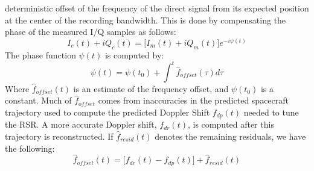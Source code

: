 \documentclass[oneside]{book}
\theoremstyle{mystyle}
\begin{document}
deterministic offset of the frequency of the direct signal from its expected position at the center of the recording bandwidth. This is done by compensating the phase of the measured I/Q samples as follows:
\begin{equation}
I_{c}(t) +iQ_{c}(t) = \big[I_{m}(t)+iQ_{m}(t)\big]e^{-i\psi(t)}
\end{equation}
\noindent The phase function $\psi(t)$ is computed by:
\begin{equation}
\psi(t) = \psi(t_0)+\int^{t} \hat{f}_{offset}(\tau)d\tau
\end{equation}
Where $\hat{f}_{offset}(t)$ is an estimate of the frequency offset, and $\psi(t_0)$ is a constant. Much of $\hat{f}_{offset}$ comes from inaccuracies in the predicted spacecraft trajectory used to compute the predicted Doppler Shift $f_{dp}(t)$ needed to tune the RSR. A more accurate Doppler shift, $f_{dr}(t)$, is computed after this trajectory is reconstructed. If $\hat{f}_{resid}(t)$ denotes the remaining residuals, we have the following:
\begin{equation}
\hat{f}_{offset}(t) = \big[f_{dr}(t)-f_{dp}(t)\big] + \hat{f}_{resid}(t)
\end{equation}
\end{document}
